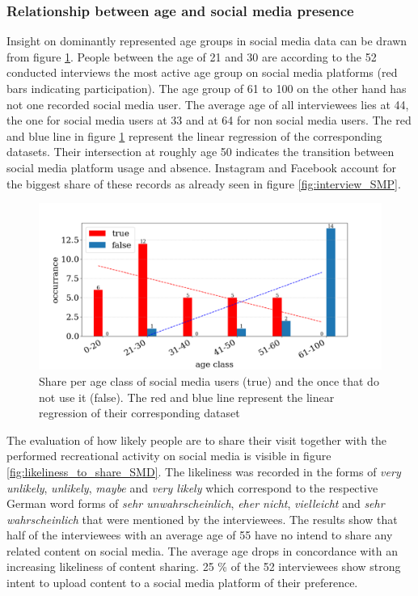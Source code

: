 \subsubsection{Relationship between age and social media presence}
Insight on dominantly represented age groups in social media data can be drawn from figure \ref{fig:interview_age_SMP}.
People between the age of 21 and 30 are according to the 52 conducted interviews the most active age group on social media platforms (red bars indicating participation). The age group of 61 to 100 on the other hand has not one recorded social media user. The average age of all interviewees lies at 44, the one for social media users at 33 and at 64 for non social media users. The red and blue line in figure \ref{fig:interview_age_SMP} represent the linear regression of the corresponding datasets. Their intersection at roughly age 50 indicates the transition between social media platform usage and absence. Instagram and Facebook account for the biggest share of these records as already seen in figure \ref{fig:interview_SMP}.

\begin{figure}[h!]
   \centering
   \includegraphics[width=\textwidth]{img/interview_socialmedia_age_bigger_font.pdf}
   \caption{Share per age class of social media users (true) and the once that do not use it (false). The red and blue line represent the linear regression of their corresponding dataset}
   \label{fig:interview_age_SMP}
\end{figure}

The evaluation of how likely people are to share their visit together with the performed recreational activity on social media is visible in figure \ref{fig:likeliness_to_share_SMD}. The likeliness was recorded in the forms of \textit{very unlikely}, \textit{unlikely}, \textit{maybe} and \textit{very likely} which correspond to the respective German word forms of \textit{sehr unwahrscheinlich}, \textit{eher nicht}, \textit{vielleicht} and \textit{sehr wahrscheinlich} that were mentioned by the interviewees. The results show that half of the interviewees with an average age of 55 have no intend to share any related content on social media. The average age drops in concordance with an increasing likeliness of content sharing. 25 \% of the 52 interviewees show strong intent to upload content to a social media platform of their preference.

